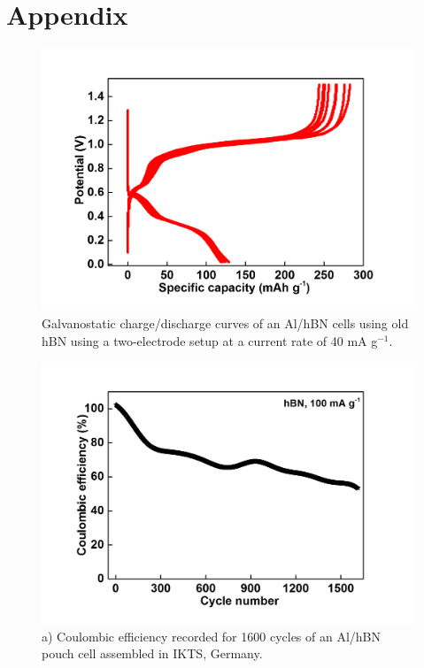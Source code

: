 \chapter{Appendix} %
\label{appA} %
\begin{figure}[tbh!]
\centering
\includegraphics[width=\textwidth]{Figures/appendix/hBNrepeat}
\caption{Galvanostatic charge/discharge curves of an Al/hBN cells using old hBN using a two-electrode setup at a current rate of 40 mA g$^{-1}$. }
\label{Figures/appendix:hBNrepeat}
\end{figure}
\begin{figure}[tbh!]
\centering
\includegraphics[width=\textwidth]{Figures/appendix/pouchCE}
\caption{a) Coulombic efficiency recorded for 1600 cycles of an Al/hBN pouch cell assembled in IKTS, Germany.}
\label{Figures/appendix:pouchCE}
\end{figure}
